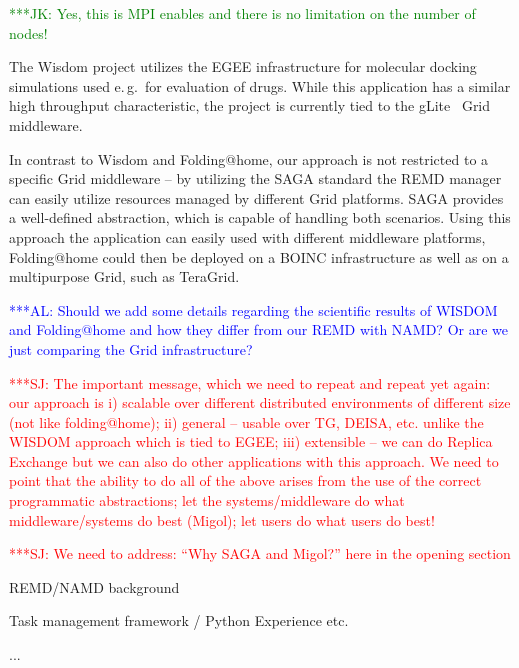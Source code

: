 \documentclass[times, 10pt,twocolumn]{article}
\newcommand{\kimnote}[1]{ {\textcolor{green} { ***JK: #1 }}}
\newcommand{\alnote}[1]{ {\textcolor{blue} { ***AL: #1 }}}
\newcommand{\jhanote}[1]{ {\textcolor{red} { ***SJ: #1 }}}
\begin{document}
  \kimnote{Yes, this is MPI enables and there is no limitation on the
    number of nodes!}

  The Wisdom project utilizes the EGEE infrastructure for molecular
  docking simulations used e.\,g.\ for evaluation of drugs. While this
  application has a similar high throughput characteristic, the
  project is currently tied to the gLite~\cite{glite2008} Grid
  middleware.

  In contrast to Wisdom and Folding@home, our approach is not
  restricted to a specific Grid middleware -- by utilizing the SAGA
  standard the REMD manager can easily utilize resources managed by
  different Grid platforms. SAGA provides a well-defined abstraction,
  which is capable of handling both scenarios. Using this approach the
  application can easily used with different middleware platforms,
  Folding@home could then be deployed on a BOINC infrastructure as
  well as on a multipurpose Grid, such as TeraGrid.

  \alnote{Should we add some details regarding the scientific results
    of WISDOM and Folding@home and how they differ from our REMD with
    NAMD?  Or are we just comparing the Grid infrastructure?}

  \jhanote{The important message, which we need to repeat and repeat
    yet again: our approach is i) scalable over different distributed
    environments of different size (not like folding@home); ii)
    general -- usable over TG, DEISA, etc. unlike the WISDOM approach
    which is tied to EGEE; iii) extensible -- we can do Replica
    Exchange but we can also do other applications with this
    approach. We need to point that the ability to do all of the above
    arises from the use of the correct programmatic abstractions; let
    the systems/middleware do what middleware/systems do best (Migol);
    let users do what users do best!}

  \jhanote{We need to address: ``Why SAGA and Migol?'' here in the
    opening section}



REMD/NAMD background

Task management framework  / Python Experience etc.

...                                  
\end{document}
